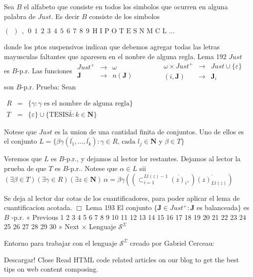 Sea \(B\) el alfabeto que consiste en todos los simbolos que ocurren en alguna palabra de \(Just\). Es decir \(B\) consiste de los simbolos

\(\displaystyle (\ \ )\ \ ,\ \ 0\ \ 1\ \ 2\ \ 3\ \ 4\ \ 5\ \ 6\ \ 7\ \ 8\ \ 9\ \ \text{H I P O T E S N M C L }... \)

donde los ptos suspensivos indican que debemos agregar todas las letras mayusculas faltantes que aparesen en el nonbre de alguna regla.
Lema 192 \(Just\) es \(B\)-p.r. Las funciones
\(\displaystyle \begin{array}{ccc} Just^{+} & \rightarrow & \omega \\ \mathbf{J} & \rightarrow & n(\mathbf{J}) \end{array} \ \ \ \ \ \ \ \ \ \ \ \ \ \ \ \ \ \begin{array}{ccc} \omega \times Just^{+} & \rightarrow & Just\cup \{\varepsilon \} \\ (i,\mathbf{J}) & \rightarrow & \mathbf{J}_{i} \end{array} \)
son \(B\)-p.r.
Prueba: Sean

\(\displaystyle \begin{array}{rcl} R & =& \{\gamma :\gamma \text{ es el nombre de alguna regla}\} \\ T & =& \{\varepsilon \}\cup \{\text{TESIS}\bar{k}:k\in \mathbf{N}\} \end{array} \)

Notese que \(Just\) es la union de una cantidad finita de conjuntos. Uno de ellos es el conjunto
\(\displaystyle L=\{\beta \gamma (\overline{l_{1}},...,\overline{l_{k}}):\gamma \in R\text{, cada }l_{j}\in \mathbf{N}\text{ y }\beta \in T\} \)

Veremos que \(L\) es \(B\)-p.r., y dejamos al lector lor restantes. Dejamos al lector la prueba de que \(T\) es \(B\)-p.r.. Notese que \(\alpha \in L\) sii
\(\displaystyle (\exists \beta \in T)(\exists \gamma \in R)(\exists z\in \mathbf{N})\ \alpha =\beta \gamma (\left( \subset _{i=1}^{Lt(z)-1}\overline{(z)_{i}},\right) \overline{(z)_{Lt(z)}}) \)

Se deja al lector dar cotas de los cuantificadores, para poder aplicar el lema de cuantificacion acotada. \(\Box\)
Lema 193 El conjunto \(\{\mathbf{J}\in Just^{+}:\mathbf{J}\) es balanceada\(\}\) es \(B\) -p.r.
« Previous
1
2
3
4
5
6
7
8
9
10
11
12
13
14
15
16
17
18
19
20
21
22
23
24
25
26
27
28
29
30
» Next
×
Lenguaje \(\mathcal{S}^{\Sigma }\)

Entorno para trabajar con el lenguaje \(\mathcal{S}^{\Sigma }\) creado por Gabriel Cerceau:

Descargar!
Close
Read HTML code related articles on our blog to get the best tips on web content composing.
